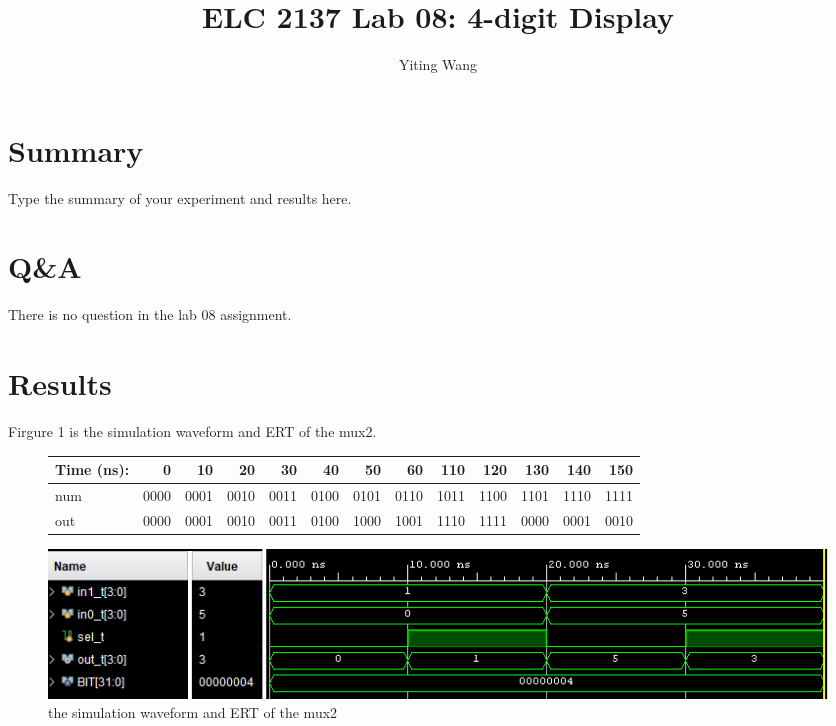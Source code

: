\documentclass[11pt]{article}
\begin{document}
\title{ELC 2137 Lab 08: 4-digit Display}
\author{Yiting Wang}

\maketitle


\section*{Summary}

Type the summary of your experiment and results here.  


\section*{Q\&A}

There is no question in the lab 08 assignment.


\section*{Results}

	Firgure 1 is the simulation waveform and ERT of the mux2.\\

\begin{figure}[ht]\centering
	\begin{tabular}{l|rrrr|rrrr|rrrr}
		Time (ns): & 0 & 10 & 20 & 30 & 40 & 50 & 60 & 110 & 120 & 130 & 140 & 150 \\
		\midrule
		num & 0000 & 0001 & 0010 & 0011 & 0100 & 0101 & 0110 & 1011 & 1100 & 1101 & 1110 & 1111 \\
		\midrule
		out & 0000 & 0001 & 0010 & 0011 & 0100 & 1000 & 1001 & 1110 & 1111 & 0000 & 0001 & 0010 \\
		\bottomrule
	\end{tabular}\medskip
	
	\includegraphics[width=1\textwidth]{mux2_simulation}
	\caption{the simulation waveform and ERT of the mux2}
	\label{fig:mux2_simulation}
\end{figure}
\end{document}
